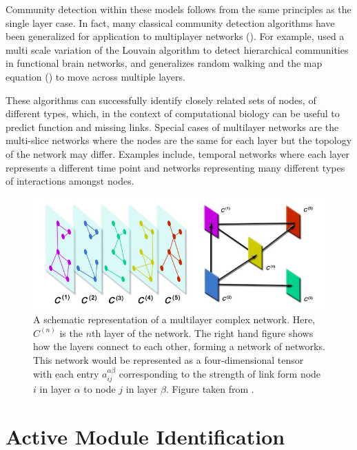 \documentclass[
11pt, %
english, %
singlespacing, %
headsepline, %
]{MastersDoctoralThesis} %
\begin{document}
Community detection within these models follows from the same principles as the single layer case. In fact, many classical community detection algorithms have been generalized for application to multiplayer networks (\cite{mucha2010community}). For example, \cite{ashourvan2017multi} used a multi scale variation of the Louvain algorithm to detect hierarchical communities in functional brain networks, and \cite{de2015identifying} generalizes random walking and the map equation (\cite{rosvall2008maps}) to move across multiple layers. 

These algorithms can successfully identify closely related sets of nodes, of different types, which, in the context of computational biology can be useful to predict function and missing links. Special cases of multilayer networks are the multi-slice networks where the nodes are the same for each layer but the topology of the network may differ. Examples include, temporal networks where each layer represents a different time point and networks representing many different types of interactions amongst nodes.

\begin{figure}
	\centering
	\includegraphics[width=\textwidth]{figures/multilayer_network}
	\caption{A schematic representation of a multilayer complex network. Here, $C^{(n)}$ is the $n$th layer of the network. The right hand figure shows how the layers connect to each other, forming a network of networks. This network would be represented as a four-dimensional tensor with each entry $a^{\alpha\beta}_{ij}$ corresponding to the strength of link form node $i$ in layer $\alpha$ to node $j$ in layer $\beta$. Figure taken from \cite{de2013mathematical}.}
\end{figure} 

\section{Active Module Identification}
\end{document}

